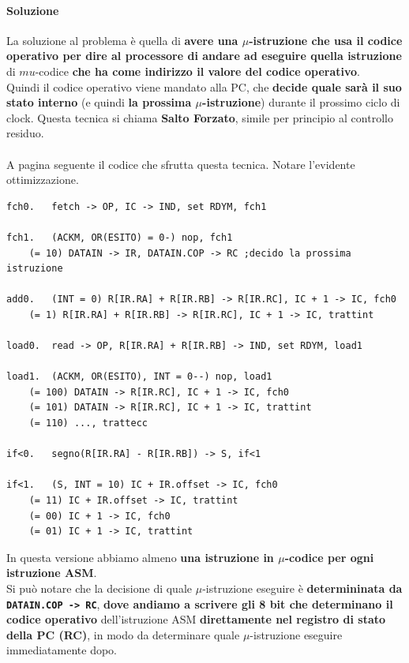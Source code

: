 \documentclass[10pt]{report}
\begin{document}
\paragraph{Soluzione} La soluzione al problema è quella di \textbf{avere una $\mu$-istruzione che usa il codice operativo per dire al processore di andare ad eseguire quella istruzione} di $mu$-codice \textbf{che ha come indirizzo il valore del codice operativo}.\\
Quindi il codice operativo viene mandato alla PC, che \textbf{decide quale sarà il suo stato interno} (e quindi \textbf{la prossima $\mu$-istruzione}) durante il prossimo ciclo di clock. Questa tecnica si chiama \textbf{Salto Forzato}, simile per principio al controllo residuo.\\\\
A pagina seguente il codice che sfrutta questa tecnica. Notare l'evidente ottimizzazione.
\pagebreak
\begin{lstlisting}
fch0.	fetch -> OP, IC -> IND, set RDYM, fch1

fch1.	(ACKM, OR(ESITO) = 0-) nop, fch1
	(= 10) DATAIN -> IR, DATAIN.COP -> RC ;decido la prossima istruzione
	
add0.	(INT = 0) R[IR.RA] + R[IR.RB] -> R[IR.RC], IC + 1 -> IC, fch0
	(= 1) R[IR.RA] + R[IR.RB] -> R[IR.RC], IC + 1 -> IC, trattint

load0.	read -> OP, R[IR.RA] + R[IR.RB] -> IND, set RDYM, load1

load1.	(ACKM, OR(ESITO), INT = 0--) nop, load1
	(= 100) DATAIN -> R[IR.RC], IC + 1 -> IC, fch0
	(= 101) DATAIN -> R[IR.RC], IC + 1 -> IC, trattint
	(= 110) ..., trattecc
	
if<0.	segno(R[IR.RA] - R[IR.RB]) -> S, if<1

if<1.	(S, INT = 10) IC + IR.offset -> IC, fch0
	(= 11) IC + IR.offset -> IC, trattint
	(= 00) IC + 1 -> IC, fch0
	(= 01) IC + 1 -> IC, trattint
\end{lstlisting}
In questa versione abbiamo almeno \textbf{una istruzione in $\mu$-codice per ogni istruzione ASM}.\\
Si può notare che la decisione di quale $\mu$-istruzione eseguire è \textbf{determininata da \texttt{DATAIN.COP -> RC}}, \textbf{dove andiamo a scrivere gli 8 bit che determinano il codice operativo} dell'istruzione ASM \textbf{direttamente nel registro di stato della PC (RC)}, in modo da determinare quale $\mu$-istruzione eseguire immediatamente dopo.
\end{document}
